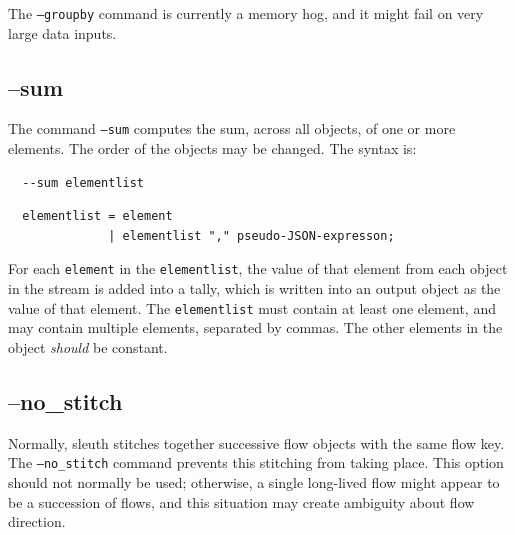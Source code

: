 \documentclass{book}
\begin{document}
The \texttt{--groupby} command is currently a memory hog, and it might
fail on very large data inputs.

\subsection{--sum}
\label{sum}
The command \texttt{--sum} computes the sum, across all objects, of one or more
elements.  The order of the objects may be changed.  The syntax is:
\begin{verbatim}
  --sum elementlist
\end{verbatim}
\begin{verbatim}
  elementlist = element
              | elementlist "," pseudo-JSON-expresson;
\end{verbatim}
For each \texttt{element} in the \texttt{elementlist}, the value of
that element from each object in the stream is added into a tally,
which is written into an output object as the value of that element.
The \texttt{elementlist} must contain at least one element, and may
contain multiple elements, separated by commas.  The other elements in
the object \textit{should} be constant.
 
\subsection{--no\_stitch}
\label{nostitch}
Normally, sleuth stitches together successive flow objects with the
same flow key.  The \texttt{--no\_stitch} command prevents this
stitching from taking place.  This option should not normally be used;
otherwise, a single long-lived flow might appear to be a succession of
flows, and this situation may create ambiguity about flow direction.
\end{document}
